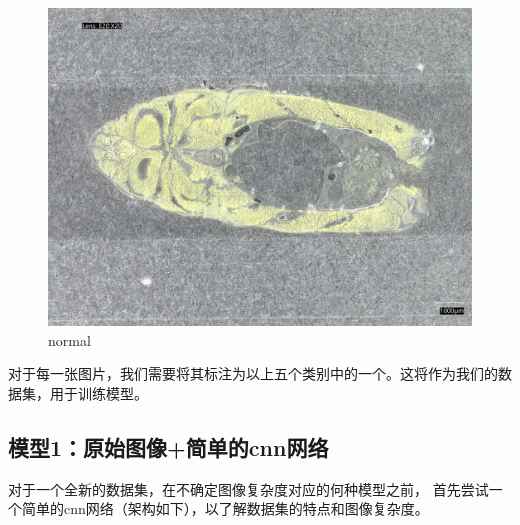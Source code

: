 \begin{figure}
    \centering
    \begin{minipage}{0.45\textwidth}
        \centering
        \includegraphics[width=\textwidth]{./fig/sample_1/normal.jpg}
        \caption{normal}
        \label{fig:normal}
    \end{minipage}
\end{figure}


对于每一张图片，我们需要将其标注为以上五个类别中的一个。这将作为我们的数据集，用于训练模型。


\FloatBarrier

\subsection{模型1：原始图像+简单的cnn网络}

对于一个全新的数据集，在不确定图像复杂度对应的何种模型之前，
首先尝试一个简单的cnn网络（架构如下），以了解数据集的特点和图像复杂度。

